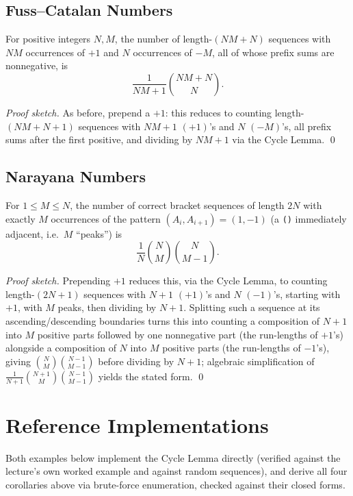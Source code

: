 \documentclass[11pt]{article}
\begin{document}
\subsection{Fuss--Catalan Numbers}
\begin{theorembox}
For positive integers $N,M$, the number of length-$(NM{+}N)$ sequences
with $NM$ occurrences of $+1$ and $N$ occurrences of $-M$, all of whose
prefix sums are nonnegative, is
\[
  \frac{1}{NM+1}\binom{NM+N}{N}.
\]

\emph{Proof sketch.} As before, prepend a $+1$: this reduces to counting
length-$(NM{+}N{+}1)$ sequences with $NM{+}1$ $(+1)$'s and $N$ $(-M)$'s,
all prefix sums after the first positive, and dividing by $NM+1$ via the
Cycle Lemma. \qed
\end{theorembox}

\subsection{Narayana Numbers}
\begin{theorembox}
For $1 \le M \le N$, the number of correct bracket sequences of length
$2N$ with exactly $M$ occurrences of the pattern $(A_i,A_{i+1})=(1,-1)$
(a \texttt{()} immediately adjacent, i.e.\ $M$ ``peaks'') is
\[
  \frac{1}{N}\binom{N}{M}\binom{N}{M-1}.
\]

\emph{Proof sketch.} Prepending $+1$ reduces this, via the Cycle Lemma, to
counting length-$(2N{+}1)$ sequences with $N{+}1$ $(+1)$'s and $N$
$(-1)$'s, starting with $+1$, with $M$ peaks, then dividing by $N+1$.
Splitting such a sequence at its ascending/descending boundaries turns
this into counting a composition of $N+1$ into $M$ positive parts
followed by one nonnegative part (the run-lengths of $+1$'s) alongside a
composition of $N$ into $M$ positive parts (the run-lengths of $-1$'s),
giving $\binom{N}{M}\binom{N-1}{M-1}$ before dividing by $N+1$; algebraic
simplification of $\frac{1}{N+1}\binom{N+1}{M}\binom{N-1}{M-1}$ yields the
stated form. \qed
\end{theorembox}

\section{Reference Implementations}
Both examples below implement the Cycle Lemma directly (verified against
the lecture's own worked example and against random sequences), and
derive all four corollaries above via brute-force enumeration, checked
against their closed forms.
\end{document}
